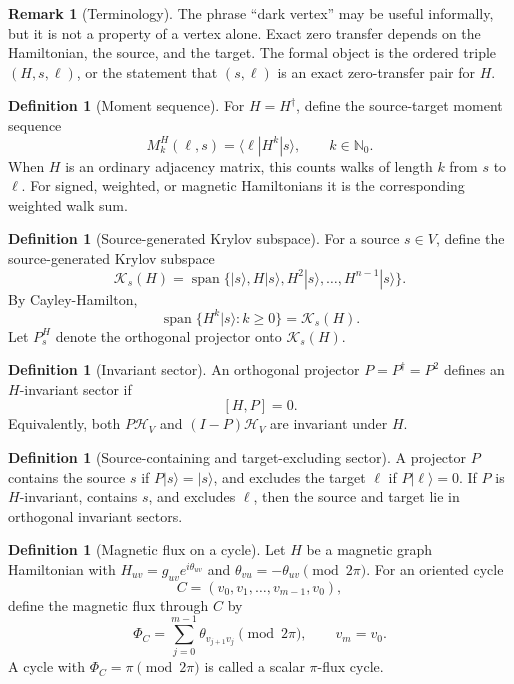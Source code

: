 \documentclass[11pt]{article}
\theoremstyle{definition}
\newtheorem{definition}[theorem]{Definition}
\newtheorem{remark}[theorem]{Remark}
\newcommand{\cH}{\mathcal H}
\newcommand{\cK}{\mathcal K}
\begin{document}
\begin{remark}[Terminology]
The phrase ``dark vertex'' may be useful informally, but it is not a property of a vertex alone. Exact zero transfer depends on the Hamiltonian, the source, and the target. The formal object is the ordered triple $(H,s,\ell)$, or the statement that $(s,\ell)$ is an exact zero-transfer pair for $H$.
\end{remark}

\begin{definition}[Moment sequence]
For $H=H^\dagger$, define the source-target moment sequence
\[
M^H_k(\ell,s)=\langle \ell|H^k|s\rangle,\qquad k\in\mathbb N_0.
\]
When $H$ is an ordinary adjacency matrix, this counts walks of length $k$ from $s$ to $\ell$. For signed, weighted, or magnetic Hamiltonians it is the corresponding weighted walk sum.
\end{definition}

\begin{definition}[Source-generated Krylov subspace]
For a source $s\in V$, define the source-generated Krylov subspace
\[
\cK_s(H)=\operatorname{span}\{|s\rangle,H|s\rangle,H^2|s\rangle,\ldots,H^{n-1}|s\rangle\}.
\]
By Cayley-Hamilton,
\[
\operatorname{span}\{H^k|s\rangle:k\ge0\}=\cK_s(H).
\]
Let $P^H_s$ denote the orthogonal projector onto $\cK_s(H)$.
\end{definition}

\begin{definition}[Invariant sector]
An orthogonal projector $P=P^\dagger=P^2$ defines an $H$-invariant sector if
\[
[H,P]=0.
\]
Equivalently, both $P\cH_V$ and $(I-P)\cH_V$ are invariant under $H$.
\end{definition}

\begin{definition}[Source-containing and target-excluding sector]
A projector $P$ contains the source $s$ if $P|s\rangle=|s\rangle$, and excludes the target $\ell$ if $P|\ell\rangle=0$. If $P$ is $H$-invariant, contains $s$, and excludes $\ell$, then the source and target lie in orthogonal invariant sectors.
\end{definition}

\begin{definition}[Magnetic flux on a cycle]
Let $H$ be a magnetic graph Hamiltonian with $H_{uv}=g_{uv}e^{i\theta_{uv}}$ and $\theta_{vu}=-\theta_{uv}\pmod{2\pi}$. For an oriented cycle
\[
C=(v_0,v_1,\ldots,v_{m-1},v_0),
\]
define the magnetic flux through $C$ by
\[
\Phi_C=\sum_{j=0}^{m-1}\theta_{v_{j+1}v_j}\pmod{2\pi},\qquad v_m=v_0.
\]
A cycle with $\Phi_C=\pi\pmod{2\pi}$ is called a scalar $\pi$-flux cycle.
\end{definition}
\end{document}
